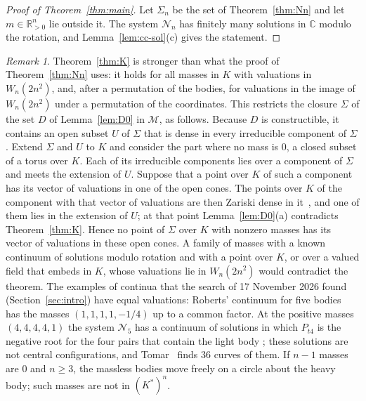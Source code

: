 \documentclass[11pt]{amsart}
\theoremstyle{definition}
\theoremstyle{remark}
\newtheorem{remark}[theorem]{Remark}
\numberwithin{equation}{section}
\newcommand{\CC}{\mathbb{C}}
\newcommand{\RR}{\mathbb{R}}
\newcommand{\cN}{\mathcal{N}}
\newcommand{\cM}{\mathcal{M}}
\begin{document}
\begin{proof}[Proof of Theorem~\ref{thm:main}]
Let $\Sigma_n$ be the set of Theorem~\ref{thm:Nn} and let $m \in \RR_{>0}^n$ lie outside it. The system
$\cN_n$ has finitely many solutions in $\CC$ modulo the rotation, and Lemma~\ref{lem:cc-sol}(c) gives the
statement.
\end{proof}

\begin{remark}\label{rem:roberts}
Theorem~\ref{thm:K} is stronger than what the proof of Theorem~\ref{thm:Nn} uses: it holds for all masses
in $K$ with valuations in $W_n(2n^2)$, and, after a permutation of the bodies, for valuations in the
image of $W_n(2n^2)$ under a permutation of the coordinates. This restricts the closure $\Sigma$ of the
set $D$ of Lemma~\ref{lem:D0} in $\cM$, as follows. Because $D$ is constructible, it contains an open
subset $U$ of $\Sigma$ that is dense in every irreducible component of $\Sigma$. Extend $\Sigma$ and
$U$ to $K$ and consider the part where no mass is $0$, a closed subset of a torus over $K$. Each of its
irreducible components lies over a component of $\Sigma$ and meets the extension of $U$. Suppose that a
point over $K$ of such a component has its vector of valuations in one of the open cones. The points
over $K$ of the component with that vector of valuations are then Zariski dense in
it~\cite[Corollary~4.2, and Remark~2 of the erratum]{payne2009}, and one of them lies in the extension
of $U$; at that point Lemma~\ref{lem:D0}(a) contradicts Theorem~\ref{thm:K}. Hence no point of $\Sigma$
over $K$ with nonzero masses has its vector of valuations in these open cones. A family of masses with
a known continuum of solutions modulo rotation and with a point over $K$, or over a valued field that
embeds in $K$, whose valuations lie in $W_n(2n^2)$ would contradict the theorem.
The examples of continua that the search of 17 November 2026 found (Section~\ref{sec:intro}) have
equal valuations: Roberts' continuum for five
bodies~\cite{roberts1999} has the masses $(1, 1, 1, 1, -1/4)$ up to a common factor. At the positive
masses $(4, 4, 4, 4, 1)$ the system $\cN_5$ has a continuum of solutions in which $P_{t4}$ is the
negative root for the four pairs that contain the light body
\cite[p.~543 and Remark~8]{albouykaloshin2012}; these solutions are not central configurations, and
Tomar~\cite{tomarspecial} finds 36 curves of them. If $n - 1$ masses are $0$ and $n \ge 3$, the
massless bodies move freely on a circle about the heavy body; such masses are not in $(K^{*})^n$.
\end{remark}
\end{document}
